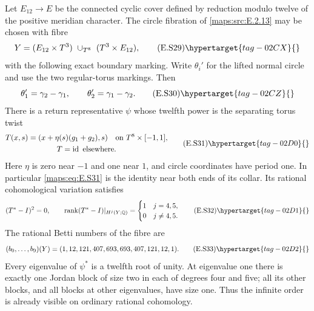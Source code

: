 \begin{theorem}\hypertarget{tag-02ME}{}\label{maps:src:E.2.14}


Let $E_{12}\to E$ be the connected cyclic cover defined by
reduction modulo twelve of the positive meridian character.
The circle fibration of \ref{maps:src:E.2.13} may be chosen with fibre
\[
 Y=(E_{12}\times T^3)\ \cup_{T^8}\ (T^3\times E_{12}),
 \tag{E.S29}\hypertarget{tag-02CX}{}\label{maps:eq:E.S29}
\]
with the following exact boundary marking. Write
$\theta_i'$ for the lifted normal circle and use the
two regular-torus markings. Then
\[
       \theta_1'=\gamma_2-\gamma_1,\qquad
       \theta_2'=\gamma_1-\gamma_2.
 \tag{E.S30}\hypertarget{tag-02CZ}{}\label{maps:eq:E.S30}
\]
There is a return representative $\psi$ whose twelfth power
is the separating torus twist
\[
 \begin{gathered}
 T(x,s)=(x+\eta(s)(g_1+g_2),s)\quad\hbox{on }T^8\times[-1,1],
 \\
 T=\operatorname{id}\text{ elsewhere}.
 \end{gathered}
 \tag{E.S31}\hypertarget{tag-02D0}{}\label{maps:eq:E.S31}
\]
Here $\eta$ is zero near $-1$ and one near $1$, and circle
coordinates have period one. In particular \eqref{maps:eq:E.S31} is the
identity near both ends of its collar. Its rational
cohomological variation satisfies
\[
 (T^*-I)^2=0,\qquad
 \operatorname{rank}(T^*-I)|_{H^j(Y;\mathbb Q)}=
 \begin{cases}1&j=4,5,\\0&j\ne4,5.\end{cases}
 \tag{E.S32}\hypertarget{tag-02D1}{}\label{maps:eq:E.S32}
\]
The rational Betti numbers of the fibre are
\[
       (b_0,\ldots,b_9)(Y)
          =(1,12,121,407,693,693,407,121,12,1).
 \tag{E.S33}\hypertarget{tag-02D2}{}\label{maps:eq:E.S33}
\]
Every eigenvalue of $\psi^*$ is a twelfth root of unity.
At eigenvalue one there is exactly one Jordan block of
size two in each of degrees four and five; all its other
blocks, and all blocks at other eigenvalues, have size one.
Thus the infinite order is already visible on ordinary
rational cohomology. \end{theorem}


